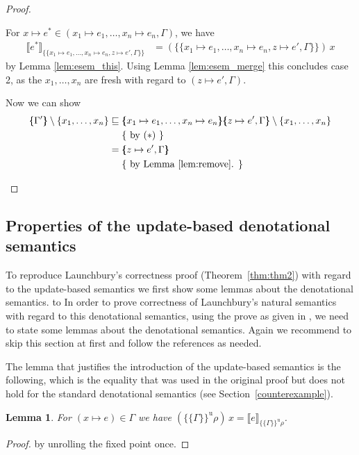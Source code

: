 \documentclass{jfp1}
\newtheorem{lemma}{Lemma}
\theoremstyle{nonumberbreak}
\newtheorem{proof}{Proof}
\newcommand{\xen}{x_1\mapsto e_1, \ldots, x_n\mapsto e_n}
\newcommand{\dsem}[2]{\llbracket #1 \rrbracket_{#2}}
\newcommand{\esem}[1]{\{\!\!\!\{#1\}\!\!\!\}}
\newcommand{\esemu}[1]{\{\!\!\!\{#1\}\!\!\!\}^{\text{u}}}
\newcommand{\aexpl}[1]{&\mathrel{\phantom{=}}\left\{\text{ #1 }\right\}}
\begin{document}
\begin{proof}
\begin{compactitem}[$\sqsubseteq$:]
\begin{compactenum}
\item For $x \mapsto e^* \in (\xen, \Gamma)$, we have
\begin{align*}
\dsem{e^*}{\esem{\xen, z \mapsto e', \Gamma}}
&= (\esem{\xen, z \mapsto e', \Gamma})\, x
\end{align*}
by Lemma \ref{lem:esem_this}. Using Lemma \ref{lem:esem_merge} this concludes case 2, as the $x_1,\ldots,x_n$ are fresh with regard to $(z\mapsto e', \Gamma)$.
\end{compactenum}

Now we can show
\begin{align*}
\esem{\Gamma'} \setminus \{x_1,\ldots,x_n\}
&\sqsubseteq  \esem{\xen}{\esem{z \mapsto e', \Gamma}}  \setminus \{x_1,\ldots,x_n\} \\
\aexpl{by ($\ast$)} \\
& = {\esem{z \mapsto e', \Gamma}} \\
\aexpl{by Lemma \ref{lem:remove}.}
\end{align*}
\end{compactitem}

\end{proof}

\subsection{Properties of the update-based denotational semantics}
\label{updsemanticsprops}

To reproduce Launchbury's correctness proof (Theorem~\ref{thm:thm2}) with regard to the update-based semantics we first show some lemmas about the denotational semantics.
to 
In order to prove correctness of Launchbury's natural semantics with regard to this denotational semantics, using the prove as given in \cite{launchbury}, we need to state some lemmas about the denotational semantics. Again we recommend to skip this section at first and follow the references as needed.

The lemma that justifies the introduction of the update-based semantics is the following, which is the equality that was used in the original proof but does not hold for the standard denotational semantics (see Section~\ref{counterexample}).

\begin{lemma}
\label{lem:esemu_this}
For $(x\mapsto e)\in \Gamma$ we have $(\esemu{\Gamma}\rho)\,x = \dsem{e}{\esemu{\Gamma}\rho}$.
\end{lemma}

\begin{proof}
by unrolling the fixed point once.
\end{proof}
\end{document}
